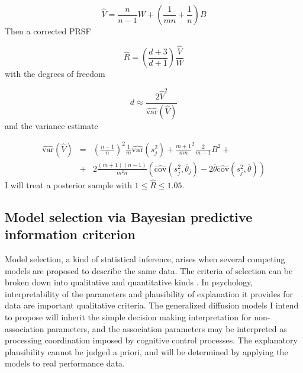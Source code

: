 \documentclass[12pt]{article}
\begin{document}
\begin{equation}
\hat V = \frac{n}{n-1}W + (\frac{1}{mn} + \frac{1}{n})B
\end{equation}
Then a corrected PRSF

\begin{equation}
\hat R = (\frac{d+3}{d+1})\frac{\hat V}{W}
\end{equation}
with the degrees of freedom

\begin{equation}
d \approx \frac{2 \hat V^2}
{\operatorname{\hat {var}} (\hat V)}
\end{equation}
and the variance estimate

\begin{eqnarray}
\operatorname{\hat {var}}(\hat V) & = & (\frac{n-1}{n})^2 \frac{1}{m} \operatorname{\hat {var}}(s_j^2) + \frac{m+1}{mn}^2 \frac{2}{m-1}B^2 + \nonumber \\
& + & 2\frac{(m+1)(n-1)}{m^2n}(\operatorname{\hat {cov}}(s_j^2,\overline\theta_j) - 2\overline\theta\operatorname{\hat {cov}}(s_j^2,\overline\theta))
\end{eqnarray}
I will treat a posterior sample with $1 \leq \hat R \leq 1.05$.

\subsection{Model selection via Bayesian predictive information criterion}
	Model selection, a kind of statistical inference, arises when several competing models are proposed to describe the same data. The criteria of selection can be broken down into qualitative and quantitative kinds \citep{MyuKar2008,ShiLee2008,VanMat2014}. In psychology, interpretability of the parameters and plausibility of explanation it provides for data are important qualitative criteria. The generalized diffusion models I intend to propose will inherit the simple decision making interpretation for non-association parameters, and the association parameters may be interpreted as processing coordination imposed by cognitive control processes. The explanatory plausibility cannot be judged a priori, and will be determined by applying the models to real performance data.
    
\end{document}
